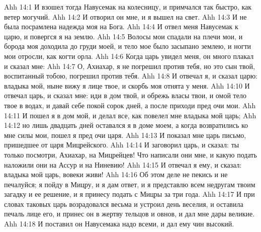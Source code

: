 \vs Ahh 14:1
И взошел тогда Навусемак на колесницу, и примчался так быстро, как ветер могучий.
\vs Ahh 14:2
И отворил он мне, и я вышел на свет.
\vs Ahh 14:3
И не была посрамлена надежда моя на Бога.
\vs Ahh 14:4
И отвел меня Навусемак к царю, и повергся я на землю.
\vs Ahh 14:5
Волосы мои спадали на плечи мои, и борода моя доходила до груди моей, и тело мое было засыпано землею, и ногти мои отросли, как когти орла.
\vs Ahh 14:6
Когда царь увидел меня, он много плакал и сказал мне:
\vs Ahh 14:7
О, Ахиахар, я не погрешил против тебя, но это сын твой, воспитанный тобою, погрешил против тебя.
\vs Ahh 14:8
И отвечал я, и сказал царю: владыка мой, ныне вижу я лице твое, и скорбь моя отнята у меня.
\vs Ahh 14:10
И отвечал царь, и сказал мне: иди в дом твой, и обрежь власы твои, и омой тело твое в водах, и давай себе покой сорок дней, а после приходи пред очи мои.
\vs Ahh 14:11
И пошел я в дом мой, и делал все, как повелел мне владыка мой царь;
\vs Ahh 14:12
но лишь двадцать дней оставался я в доме моем, а когда возвратились ко мне силы мои, пошел я пред очи царя.
\vs Ahh 14:13
И показал мне царь письмо, пришедшее от царя Мицрейского.
\vs Ahh 14:14
И заговорил царь, и сказал: ты только посмотри, Ахиахар, на Мицрейцев! Что написали они мне, и какую подать наложили они на Ассур и на Ниневию!
\vs Ahh 14:15
И отвечал я ему, и сказал: владыка мой царь, вовеки живи!
\vs Ahh 14:16
Об этом деле не пекись и не печалуйся; я пойду в Мицру, и я дам ответ, и я представлю всем недругам твоим загадку и ее решение, и я принесу подать с Мицры за три года.
\vs Ahh 14:17
И при словах таковых царь возрадовался весьма и устроил день веселия, и оставила печаль лице его, и принес он в жертву тельцов и овнов, и дал мне дары великие.
\vs Ahh 14:18
И поставил он Навусемака надо всеми, и дал ему чин высокий.

